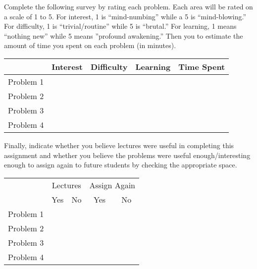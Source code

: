 \documentclass[11pt,letterpaper]{article}
\begin{document}
\newpage



 \pvspace{0.3cm}

Complete the following survey by rating each problem. Each area will be rated on a scale of 1 to 5. For interest, 1 is ``mind-numbing'' while a 5 is ``mind-blowing.'' For difficulty, 1 is ``trivial/routine'' while 5 is ``brutal.'' For learning, 1 means ``nothing new'' while 5 means ''profound awakening.'' Then you to estimate the amount of time you spent on each problem (in minutes). 

\vspace{0.25cm}
\begin{center}
\begin{tabular}{c||c|c|c|c|}
 & Interest & Difficulty & Learning & Time Spent \\ \hline \hline
Problem 1 &  &  &  &  \\ \hline
Problem 2 &  &  &  &  \\ \hline
Problem 3 &  &  &  &  \\ \hline
Problem 4 &  &  &  & 
\end{tabular}
\end{center}
\vspace{0.25cm}

Finally, indicate whether you believe lectures were useful in completing this assignment and whether you believe the problems were useful enough/interesting enough to assign again to future students by checking the appropriate space.

\vspace{0.25cm}
\begin{center}
\begin{tabular}{c||c|c|c|c|}
  & \multicolumn{2}{c|}{Lectures} &  \multicolumn{2}{c|}{Assign Again} \\ \cline{2-5}
   & Yes & No & Yes & No \\ \hline \hline
  Problem 1 &  &  &  &  \\ \hline 
  Problem 2 &  &  &  &  \\ \hline 
  Problem 3 &  &  &  &  \\ \hline 
  Problem 4 &  &  &  & 
\end{tabular}
\end{center}
\end{document}
